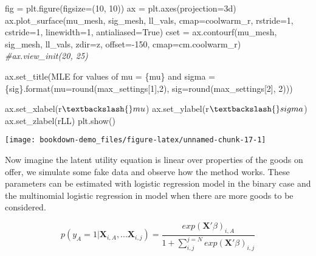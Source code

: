 \documentclass[]{tufte-book}
\newenvironment{Shaded}{}{}
\newcommand{\BuiltInTok}[1]{#1}
\newcommand{\CommentTok}[1]{\textcolor[rgb]{0.38,0.63,0.69}{\textit{#1}}}
\newcommand{\DecValTok}[1]{\textcolor[rgb]{0.25,0.63,0.44}{#1}}
\newcommand{\NormalTok}[1]{#1}
\newcommand{\OperatorTok}[1]{\textcolor[rgb]{0.40,0.40,0.40}{#1}}
\newcommand{\SpecialCharTok}[1]{\textcolor[rgb]{0.25,0.44,0.63}{#1}}
\newcommand{\StringTok}[1]{\textcolor[rgb]{0.25,0.44,0.63}{#1}}
\newcommand{\VariableTok}[1]{\textcolor[rgb]{0.10,0.09,0.49}{#1}}
\newcommand{\VerbatimStringTok}[1]{\textcolor[rgb]{0.25,0.44,0.63}{#1}}
\theoremstyle{definition}
\theoremstyle{definition}
\theoremstyle{definition}
\theoremstyle{remark}
\begin{document}
\begin{Shaded}
\begin{Highlighting}[]
\NormalTok{fig }\OperatorTok{=}\NormalTok{ plt.figure(figsize}\OperatorTok{=}\NormalTok{(}\DecValTok{10}\NormalTok{, }\DecValTok{10}\NormalTok{))}
\NormalTok{ax }\OperatorTok{=}\NormalTok{ plt.axes(projection}\OperatorTok{=}\StringTok{\textquotesingle{}3d\textquotesingle{}}\NormalTok{)}
\NormalTok{ax.plot\_surface(mu\_mesh, sig\_mesh, ll\_vals, }
\NormalTok{cmap}\OperatorTok{=}\StringTok{\textquotesingle{}coolwarm\_r\textquotesingle{}}\NormalTok{, rstride}\OperatorTok{=}\DecValTok{1}\NormalTok{, cstride}\OperatorTok{=}\DecValTok{1}\NormalTok{, linewidth}\OperatorTok{=}\DecValTok{1}\NormalTok{, antialiased}\OperatorTok{=}\VariableTok{True}\NormalTok{)}
\NormalTok{cset }\OperatorTok{=}\NormalTok{ ax.contourf(mu\_mesh, sig\_mesh, ll\_vals, zdir}\OperatorTok{=}\StringTok{\textquotesingle{}z\textquotesingle{}}\NormalTok{, offset}\OperatorTok{={-}}\DecValTok{150}\NormalTok{, cmap}\OperatorTok{=}\NormalTok{cm.coolwarm\_r)}
\CommentTok{\#ax.view\_init(20, 25)}

\NormalTok{ax.set\_title(}\StringTok{\textquotesingle{}MLE for values of mu = }\SpecialCharTok{\{mu\}}\StringTok{ and sigma = }\SpecialCharTok{\{sig\}}\StringTok{\textquotesingle{}}\NormalTok{.}\BuiltInTok{format}\NormalTok{(mu}\OperatorTok{=}\BuiltInTok{round}\NormalTok{(max\_settings[}\DecValTok{1}\NormalTok{],}\DecValTok{2}\NormalTok{),}
\NormalTok{sig}\OperatorTok{=}\BuiltInTok{round}\NormalTok{(max\_settings[}\DecValTok{2}\NormalTok{], }\DecValTok{2}\NormalTok{)))}

\NormalTok{ax.set\_xlabel(}\VerbatimStringTok{r\textquotesingle{}$\textbackslash{}mu$\textquotesingle{}}\NormalTok{)}
\NormalTok{ax.set\_ylabel(}\VerbatimStringTok{r\textquotesingle{}$\textbackslash{}sigma$\textquotesingle{}}\NormalTok{)}
\NormalTok{ax.set\_zlabel(}\VerbatimStringTok{r\textquotesingle{}LL\textquotesingle{}}\NormalTok{)}
\NormalTok{plt.show()}
\end{Highlighting}
\end{Shaded}

\texttt{[image: bookdown-demo\_files/figure-latex/unnamed-chunk-17-1]}

Now imagine the latent utility equation is linear over properties of the goods on offer, we simulate some fake data and observe how the method works. These parameters can be estimated with logistic regression model in the binary case and the multinomial logistic regression in model when there are more goods to be considered.

\[ p(y_A = 1 | \mathbf{X}_{i, A}, ...  \mathbf{X}_{i, j}) = \frac{ exp(\mathbf{X'}\beta)_{i, A}}{1 + \sum_{i, j}^{j=N} exp(\mathbf{X'}\beta)_{i, j} }  \]
\end{document}
